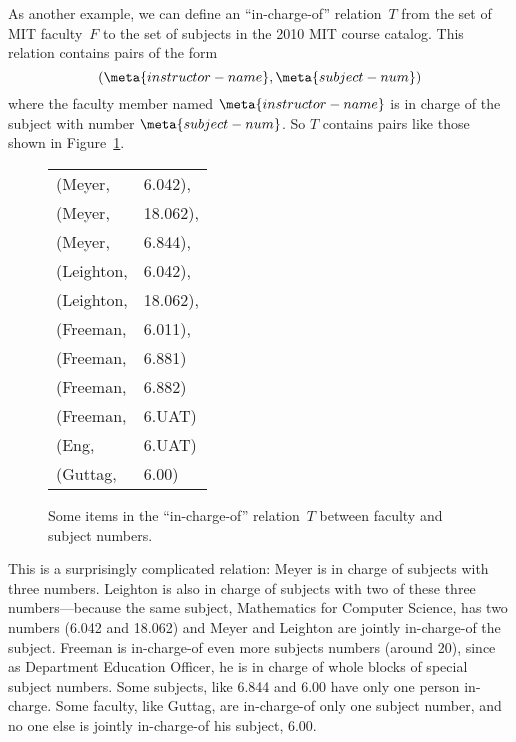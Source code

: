 As another example, we can define an ``in-charge-of'' relation~$T$
from the set of MIT faculty~$F$ to the set of subjects in the 2010 MIT
course catalog.  This relation contains pairs of the form
\[
    (\meta{instructor-name}, \meta{subject-num})
\]
where the faculty member named $\meta{instructor-name}$ is in charge
of the subject with number $\meta{subject-num}$.  So $T$ contains
pairs like those shown in Figure~\ref{fig:7FA}.

\begin{figure}\redrawntrue

\begin{tabular}{ll}
(Meyer,    & 6.042),\\
(Meyer,    & 18.062),\\
(Meyer,    & 6.844),\\
(Leighton, & 6.042),\\
(Leighton, & 18.062),\\
(Freeman,  & 6.011),\\
(Freeman,  & 6.881)\\
(Freeman,  & 6.882)\\
(Freeman,  & 6.UAT)\\
(Eng,      & 6.UAT)\\
(Guttag,   & 6.00)
\end{tabular}

\caption{Some items in the ``in-charge-of'' relation~$T$ between
  faculty and subject numbers.}

\label{fig:7FA}

\end{figure}

%
This is a surprisingly complicated relation: Meyer is in charge of
subjects with three numbers.  Leighton is also in charge of subjects
with two of these three numbers---because the same subject,
Mathematics for Computer Science, has two numbers (6.042 and 18.062)
and Meyer and Leighton are jointly in-charge-of the subject.  Freeman
is in-charge-of even more subjects numbers (around 20), since as
Department Education Officer, he is in charge of whole blocks of
special subject numbers.  Some subjects, like 6.844 and 6.00 have only
one person in-charge.  Some faculty, like Guttag, are in-charge-of
only one subject number, and no one else is jointly in-charge-of his
subject, 6.00.

